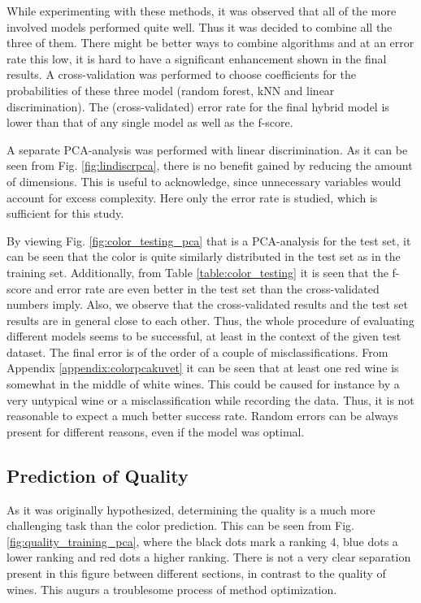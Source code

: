 \documentclass[twoside]{article}
\begin{document}
\begin{multicols}{2}
While experimenting with these methods, it was observed that all of the more involved models performed quite well. Thus it was
decided to combine all the three of them. There might be better ways to combine algorithms and at an error rate this low, it is
hard to have a significant enhancement shown in the final results. A cross-validation was performed to choose coefficients for
the probabilities of these three model (random forest, kNN and linear discrimination). The (cross-validated) error rate for the final hybrid model
is lower than that of any single model as well as the f-score.

A separate PCA-analysis was performed with linear discrimination. As it can be seen from Fig. \ref{fig:lindiscrpca}, there is no
benefit gained by reducing the amount of dimensions. This is useful to acknowledge, since unnecessary variables would
account for excess complexity. Here only the error rate is studied, which is sufficient for this study.

By viewing Fig. \ref{fig:color_testing_pca} that is a PCA-analysis for the test set, it can be seen that the color is quite similarly 
distributed in the test set as in the training set. Additionally, from Table \ref{table:color_testing} it is seen that the f-score and
error rate are even better in the test set than the cross-validated numbers imply. Also, we observe that the cross-validated results and the
test set results are in general close to each other. Thus, the whole procedure of evaluating different models seems to be successful,
at least in the context of the given test dataset. The final error is of the order of a couple of misclassifications. From Appendix
\ref{appendix:colorpcakuvet} it can be seen that at least one red wine is somewhat in the middle of white wines. This could be caused for instance 
by a very untypical wine or a misclassification while recording the data. Thus, it is not reasonable to expect a much better success rate. Random
errors can be always present for different reasons, even if the model was optimal.

\subsection{Prediction of Quality}

As it was originally hypothesized, determining the quality is a much more challenging task than the color prediction. This can be seen from Fig.
\ref{fig:quality_training_pca}, where the black dots mark a ranking 4, blue dots a lower ranking and red dots a higher ranking. There is not a
very clear separation present in this figure between different sections, in contrast to the quality of wines. This augurs a troublesome
process of method optimization.


\end{multicols}
\end{document}
